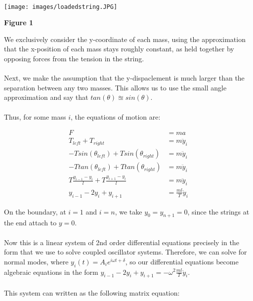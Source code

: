 \documentclass[12pt]{amsart}
\theoremstyle{definition}
\theoremstyle{remark}
\begin{document}
\\
\begin{center}
    \texttt{[image: images/loadedstring.JPG]}
\end{center}
\begin{center}
    \bf{Figure 1}
\end{center}
\vspace{.25in}
We exclusively consider the y-coordinate of each mass, using the approximation that the x-position of each mass stays roughly constant, as held together by opposing forces from the 
tension in the string. \\ 
\\ 
Next, we make the assumption that the y-dispaclement is much larger than the separation between any two masses. This allows us to use the small 
angle approximation and say that $tan(\theta) \approxeq sin(\theta)$.\\
\\ 
Thus, for some mass $i$, the equations of motion are: 

\begin{align*} 
    F &= ma \\ 
    T_{left} + T_{right} &= m\ddot y_i \\ 
    -Tsin(\theta_{left}) + Tsin(\theta_{right}) &= m\ddot y_i \\ 
    -Ttan(\theta_{left}) + Ttan(\theta_{right}) &= m\ddot y_i \\ 
    T \frac{y_{i-1}-y_i}{l} + T \frac{y_{i+1}-y_i}{l} &= m\ddot y_i \\
    y_{i-1} - 2y_i +y_{i+1} &= \frac{ml}{T}\ddot y_i
\end{align*}

On the boundary, at $i = 1$ and $i = n$, we take $y_0 = y_{n+1} = 0$, since 
the strings at the end attach to $y = 0$.\\ 
\\ 
Now this is a linear system of 2nd order differential equations precisely in the form 
that we use to solve coupled oscillator systems. Therefore, we can solve for normal modes, 
where $y_i(t) = A_i e^{i\omega t + \delta}$, so our differential equations become algebraic 
equations in the form $y_{i-1} - 2y_i + y_{i+1} = -\omega ^2 \frac{ml}{T}\ddot y_i$.\\ 
\\ 
This system can written as the following matrix equation:
\end{document}
